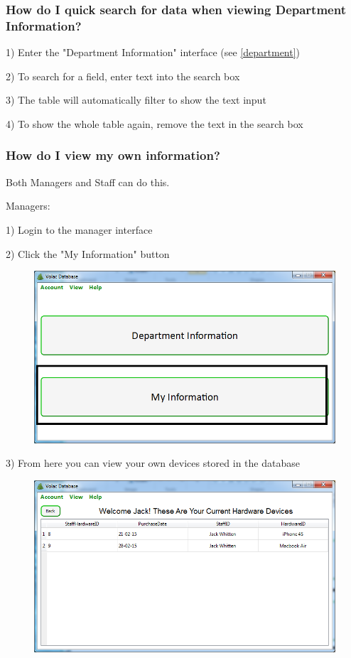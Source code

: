 \subsubsection{How do I quick search for data when viewing Department Information?}

1) Enter the "Department Information" interface (see \ref{department})

2) To search for a field, enter text into the search box 

3) The table will automatically filter to show the text input

4) To show the whole table again, remove the text in the search box

\subsubsection{How do I view my own information?}

Both Managers and Staff can do this.

Managers:

1) Login to the manager interface

2) Click the "My Information" button 

\begin{figure}[H]
    \includegraphics[width=\textwidth]{./Manual/Images/myinfo.png}
\end{figure}

3) From here you can view your own devices stored in the database

\begin{figure}[H]
    \includegraphics[width=\textwidth]{./Manual/Images/myinfo2.png}
\end{figure}

